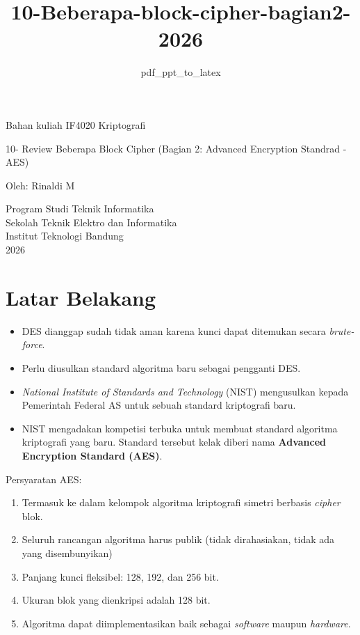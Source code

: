 \documentclass{article}
\title{10-Beberapa-block-cipher-bagian2-2026}
\author{pdf\_ppt\_to\_latex}
\date{}
\begin{document}

\begin{center}
Bahan kuliah IF4020 Kriptografi

{\huge \color{red} 10- Review Beberapa Block Cipher}
{\large \color{red} (Bagian 2: Advanced Encryption Standrad - AES)}

\vspace{30mm}

Oleh: Rinaldi M

\vspace{10mm}

Program Studi Teknik Informatika\\
Sekolah Teknik Elektro dan Informatika\\
Institut Teknologi Bandung\\
2026
\end{center}

\newpage


\section*{Latar Belakang}

\begin{itemize}
    \item DES dianggap sudah tidak aman karena kunci dapat ditemukan secara \textit{brute-force}.
    \item Perlu diusulkan standard algoritma baru sebagai pengganti DES.
    \item \textit{National Institute of Standards and Technology} (NIST) mengusulkan kepada Pemerintah Federal AS untuk sebuah standard kriptografi baru.
    \item NIST mengadakan kompetisi terbuka untuk membuat standard algoritma kriptografi yang baru. Standard tersebut kelak diberi nama \textbf{Advanced Encryption Standard (AES)}.
\end{itemize}

\newpage


Persyaratan AES:\
\begin{enumerate}
  \item Termasuk ke dalam kelompok algoritma kriptografi simetri berbasis \textit{cipher} blok.
  \item Seluruh rancangan algoritma harus publik (tidak dirahasiakan, tidak ada yang disembunyikan)
  \item Panjang kunci fleksibel: 128, 192, dan 256 bit.
  \item Ukuran blok yang dienkripsi adalah 128 bit.
  \item Algoritma dapat diimplementasikan baik sebagai \textit{software} maupun \textit{hardware}.
\end{enumerate}
\end{document}
